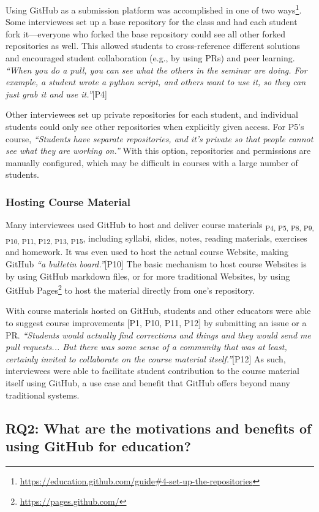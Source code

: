 Using GitHub as a submission platform was accomplished in one of two ways\footnote{\url{https://education.github.com/guide\#4-set-up-the-repositories}}. Some interviewees set up a base repository for the class and had each student fork it---everyone who forked the base repository could see all other forked repositories as well. This allowed students to cross-reference different solutions and encouraged student collaboration (e.g., by using PRs) and peer learning. \textit{``When you do a pull, you can see what the others in the seminar are doing. For example, a student wrote a python script, and others want to use it, so they can just grab it and use it.''}[P4]

Other interviewees set up private repositories for each student, and individual students could only see other repositories when explicitly given access. For P5's course, \textit{``Students have separate repositories, and it's private so that people cannot see what they are working on.''} With this option, repositories and permissions are manually configured, which may be difficult in courses with a large number of students.

\subsubsection{Hosting Course Material}
Many interviewees used GitHub to host and deliver course materials \textsubscript{P4, P5, P8, P9, P10, P11, P12, P13, P15}, including syllabi, slides, notes, reading materials, exercises and homework. It was even used to host the actual course Website, making GitHub \textit{``a bulletin board.''}[P10] The basic mechanism to host course Websites is by using GitHub markdown files, or for more traditional Websites, by using GitHub Pages\footnote{\url{https://pages.github.com/}} to host the material directly from one's repository.

With course materials hosted on GitHub, students and other educators were able to suggest course improvements [P1, P10, P11, P12] by submitting an issue or a PR. \textit{``Students would actually find corrections and things and they would send me pull requests... But there was some sense of a community that was at least, certainly invited to collaborate on the course material itself.''}[P12] As such, interviewees were able to facilitate student contribution to the course material itself using GitHub, a use case and benefit that GitHub offers beyond many traditional systems.

\subsection{RQ2: What are the motivations and benefits of using GitHub for education?}

